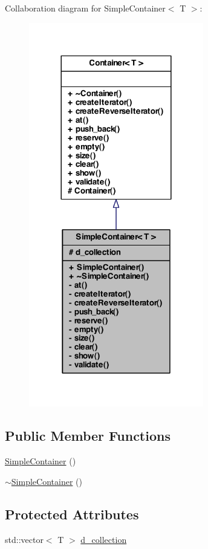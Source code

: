 Collaboration diagram for SimpleContainer$<$ T $>$:
\nopagebreak
\begin{figure}[H]
\begin{center}
\leavevmode
\includegraphics[width=216pt]{class_simple_container__coll__graph}
\end{center}
\end{figure}
\subsection*{Public Member Functions}
\begin{DoxyCompactItemize}
\item 
\hyperlink{class_simple_container_a87d087aab51b4b6aad359ad906a90e4d}{SimpleContainer} ()
\item 
\hyperlink{class_simple_container_ad0704bf9c306ab57a9c4a2b83879670c}{$\sim$SimpleContainer} ()
\end{DoxyCompactItemize}
\subsection*{Protected Attributes}
\begin{DoxyCompactItemize}
\item 
std::vector$<$ T $>$ \hyperlink{class_simple_container_a0be5592282fc09b51a344d4083a7daf9}{d\_\-collection}
\end{DoxyCompactItemize}
